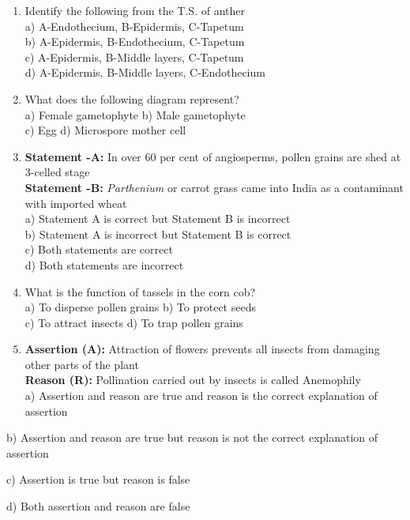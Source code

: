 \begin{enumerate}
\def\labelenumi{\arabic{enumi}.}
\setcounter{enumi}{138}
\item
  Identify the following from the T.S. of anther\\
  a) A-Endothecium, B-Epidermis, C-Tapetum\\
  b) A-Epidermis, B-Endothecium, C-Tapetum\\
  c) A-Epidermis, B-Middle layers, C-Tapetum\\
  d) A-Epidermis, B-Middle layers, C-Endothecium
\item
  What does the following diagram represent?\\
  a) Female gametophyte b) Male gametophyte\\
  c) Egg d) Microspore mother cell
\item
  \textbf{Statement -A:} In over 60 per cent of angiosperms, pollen
  grains are shed at 3-celled stage\\
  \textbf{Statement -B:} \emph{Parthenium} or carrot grass came into
  India as a contaminant with imported wheat\\
  a) Statement A is correct but Statement B is incorrect\\
  b) Statement A is incorrect but Statement B is correct\\
  c) Both statements are correct\\
  d) Both statements are incorrect
\item
  What is the function of tassels in the corn cob?\\
  a) To disperse pollen grains b) To protect seeds\\
  c) To attract insects d) To trap pollen grains
\item
  \textbf{Assertion (A):} Attraction of flowers prevents all insects
  from damaging other parts of the plant\\
  \textbf{Reason (R):} Pollination carried out by insects is called
  Anemophily\\
  a) Assertion and reason are true and reason is the correct explanation
  of assertion
\end{enumerate}

b) Assertion and reason are true but reason is not the correct
explanation of assertion

c) Assertion is true but reason is false

d) Both assertion and reason are false

